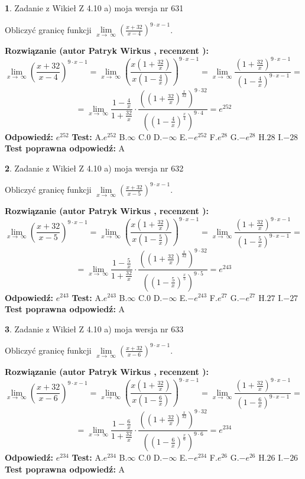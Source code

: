 \documentclass[12pt, a4paper]{article}
\theoremstyle{definition} %
\newtheorem{zad}{}
\newcommand{\zadStart}[1]{\begin{zad}#1\newline}
\newcommand{\zadStop}{\end{zad}}
\newcommand{\rozwStart}[2]{\noindent \textbf{Rozwiązanie (autor #1 , recenzent #2): }\newline}
\newcommand{\rozwStop}{\newline}
\newcommand{\odpStart}{\noindent \textbf{Odpowiedź:}\newline}
\newcommand{\odpStop}{\newline}
\newcommand{\testStart}{\noindent \textbf{Test:}\newline}
\newcommand{\testStop}{\newline}
\newcommand{\kluczStart}{\noindent \textbf{Test poprawna odpowiedź:}\newline}
\newcommand{\kluczStop}{\newline}
\begin{document}
\zadStart{Zadanie z Wikieł Z 4.10 a) moja wersja nr 631}

Obliczyć granicę funkcji  $\lim\limits_{x\to\ \infty}(\frac{x+32}{x-4})^{9\cdot x-1}$.
\zadStop
\rozwStart{Patryk Wirkus}{}
$$\lim\limits_{x\to\ \infty}(\frac{x+32}{x-4})^{9\cdot x-1} = \lim\limits_{x\to\ \infty}(\frac{x(1+\frac{32}{x})}{x(1-\frac{4}{x})})^{9\cdot x-1}=\lim\limits_{x\to\ \infty}\frac{(1+\frac{32}{x})^{9\cdot x-1}}{(1-\frac{4}{x})^{9\cdot x-1}}=$$
$$=\lim\limits_{x\to\ \infty}\frac{1-\frac{4}{x}}{1+\frac{32}{x}}\cdot\frac{((1+\frac{32}{x})^{\frac{x}{32}})^{9\cdot32}}{((1-\frac{4}{x})^{\frac{x}{4}})^{9\cdot4}}=e^{252}$$
\rozwStop
\odpStart
$e^{252}$
\odpStop
\testStart
A.$e^{252}$ B.$\infty$ C.$0$ D.$-\infty$ E.$-e^{252}$
F.$e^{28}$ G.$-e^{28}$
H.$28$
I.$-28$
\testStop
\kluczStart
A
\kluczStop



\zadStart{Zadanie z Wikieł Z 4.10 a) moja wersja nr 632}

Obliczyć granicę funkcji  $\lim\limits_{x\to\ \infty}(\frac{x+32}{x-5})^{9\cdot x-1}$.
\zadStop
\rozwStart{Patryk Wirkus}{}
$$\lim\limits_{x\to\ \infty}(\frac{x+32}{x-5})^{9\cdot x-1} = \lim\limits_{x\to\ \infty}(\frac{x(1+\frac{32}{x})}{x(1-\frac{5}{x})})^{9\cdot x-1}=\lim\limits_{x\to\ \infty}\frac{(1+\frac{32}{x})^{9\cdot x-1}}{(1-\frac{5}{x})^{9\cdot x-1}}=$$
$$=\lim\limits_{x\to\ \infty}\frac{1-\frac{5}{x}}{1+\frac{32}{x}}\cdot\frac{((1+\frac{32}{x})^{\frac{x}{32}})^{9\cdot32}}{((1-\frac{5}{x})^{\frac{x}{5}})^{9\cdot5}}=e^{243}$$
\rozwStop
\odpStart
$e^{243}$
\odpStop
\testStart
A.$e^{243}$ B.$\infty$ C.$0$ D.$-\infty$ E.$-e^{243}$
F.$e^{27}$ G.$-e^{27}$
H.$27$
I.$-27$
\testStop
\kluczStart
A
\kluczStop



\zadStart{Zadanie z Wikieł Z 4.10 a) moja wersja nr 633}

Obliczyć granicę funkcji  $\lim\limits_{x\to\ \infty}(\frac{x+32}{x-6})^{9\cdot x-1}$.
\zadStop
\rozwStart{Patryk Wirkus}{}
$$\lim\limits_{x\to\ \infty}(\frac{x+32}{x-6})^{9\cdot x-1} = \lim\limits_{x\to\ \infty}(\frac{x(1+\frac{32}{x})}{x(1-\frac{6}{x})})^{9\cdot x-1}=\lim\limits_{x\to\ \infty}\frac{(1+\frac{32}{x})^{9\cdot x-1}}{(1-\frac{6}{x})^{9\cdot x-1}}=$$
$$=\lim\limits_{x\to\ \infty}\frac{1-\frac{6}{x}}{1+\frac{32}{x}}\cdot\frac{((1+\frac{32}{x})^{\frac{x}{32}})^{9\cdot32}}{((1-\frac{6}{x})^{\frac{x}{6}})^{9\cdot6}}=e^{234}$$
\rozwStop
\odpStart
$e^{234}$
\odpStop
\testStart
A.$e^{234}$ B.$\infty$ C.$0$ D.$-\infty$ E.$-e^{234}$
F.$e^{26}$ G.$-e^{26}$
H.$26$
I.$-26$
\testStop
\kluczStart
A
\kluczStop
\end{document}
